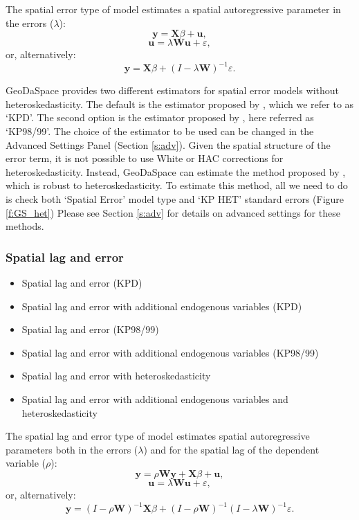 \documentclass{article}
\begin{document}
The spatial error type of model estimates a spatial autoregressive parameter in the errors ($\lambda$):
\begin{equation}
\mathbf{y} =  \mathbf{X}\beta + \mathbf{u},
\end{equation}
\begin{equation}
\mathbf{u} =  \lambda \mathbf{W} \mathbf{u} + \varepsilon,
\end{equation}
or, alternatively:
\begin{equation}
\mathbf{y} =  \mathbf{X}\beta + (I - \lambda \mathbf{W})^{-1} \varepsilon.
\end{equation}

GeoDaSpace provides two different estimators for spatial error models without heteroskedasticity. The default is the estimator proposed by \citet{Drukker10}, which we refer to as `KPD'. The second option is the estimator proposed by \citet{Kelejian98,Kelejian99}, here referred as `KP98/99'. The choice of the estimator to be used can be changed in the Advanced Settings Panel (Section \ref{s:adv}). Given the spatial structure of the error term, it is not possible to use White or HAC corrections for heteroskedasticity. Instead, GeoDaSpace can estimate the method proposed by \citet{Arraiz10}, which is robust to heteroskedasticity. To estimate this method, all we need to do is check both `Spatial Error' model type and `KP HET' standard errors (Figure \ref{f:GS_het}) Please see Section \ref{s:adv} for details on advanced settings for these methods.
\FloatBarrier

\subsubsection*{Spatial lag and error}
\begin{itemize}
\item Spatial lag and error (KPD)
\item Spatial lag and error with additional endogenous variables (KPD)
\item Spatial lag and error (KP98/99)
\item Spatial lag and error with additional endogenous variables (KP98/99)
\item Spatial lag and error with heteroskedasticity
\item Spatial lag and error with additional endogenous variables and heteroskedasticity
\end{itemize}

The spatial lag and error type of model estimates spatial autoregressive parameters both in the errors ($\lambda$) and for the spatial lag of the dependent variable ($\rho$):
\begin{equation}
\mathbf{y} = \rho \mathbf{W} \mathbf{y} + \mathbf{X}\beta + \mathbf{u},
\end{equation}
\begin{equation}
\mathbf{u} =  \lambda \mathbf{W} \mathbf{u} + \varepsilon,
\end{equation}
or, alternatively:
\begin{equation}
\mathbf{y} =  (I - \rho \mathbf{W})^{-1} \mathbf{X}\beta + (I - \rho \mathbf{W})^{-1}(I - \lambda \mathbf{W})^{-1} \varepsilon.
\end{equation}
\end{document}
